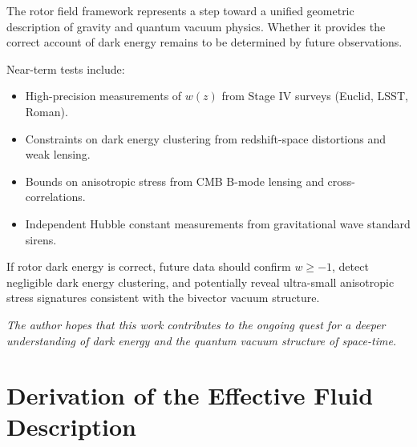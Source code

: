 \documentclass[11pt,a4paper]{article}
\numberwithin{equation}{section}
\theoremstyle{plain}
\theoremstyle{definition}
\theoremstyle{remark}
\newif\ifack
\begin{document}
The rotor field framework represents a step toward a unified geometric description of gravity and quantum vacuum physics. Whether it provides the correct account of dark energy remains to be determined by future observations.

Near-term tests include:
\begin{itemize}
  \item High-precision measurements of $w(z)$ from Stage IV surveys (Euclid, LSST, Roman).
  \item Constraints on dark energy clustering from redshift-space distortions and weak lensing.
  \item Bounds on anisotropic stress from CMB B-mode lensing and cross-correlations.
  \item Independent Hubble constant measurements from gravitational wave standard sirens.
\end{itemize}

If rotor dark energy is correct, future data should confirm $w \geq -1$, detect negligible dark energy clustering, and potentially reveal ultra-small anisotropic stress signatures consistent with the bivector vacuum structure.

\medskip
\noindent\textit{The author hopes that this work contributes to the ongoing quest for a deeper understanding of dark energy and the quantum vacuum structure of space-time.}

\ifack
\section*{Acknowledgements}
The author is grateful for the pioneering work of David Hestenes and colleagues in developing geometric algebra as a language for physics. The contributions of Anthony Lasenby and Chris Doran on gauge theory gravity and cosmological applications provided essential foundations. Thanks are due to the Planck, LIGO, and Supernova Cosmology Project teams for making data publicly available. This work was conducted independently without external funding.
\fi

\appendix

\section{Derivation of the Effective Fluid Description}
\label{app:fluid}
\end{document}
